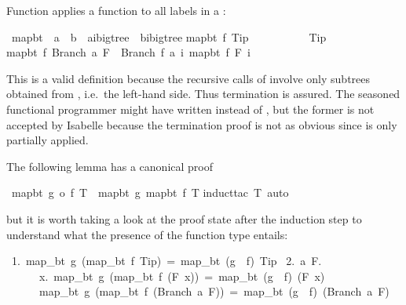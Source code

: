 \begin{isabelle}
\begin{isamarkuptext}
Function  applies a function to all labels in a :%
\end{isamarkuptext}%
\ map{\isacharunderscore}bt\ {\isacharcolon}{\isacharcolon}\ {\isachardoublequote}{\isacharparenleft}{\isacharprime}a\ {\isasymRightarrow}\ {\isacharprime}b{\isacharparenright}\ {\isasymRightarrow}\ {\isacharparenleft}{\isacharprime}a{\isacharcomma}{\isacharprime}i{\isacharparenright}bigtree\ {\isasymRightarrow}\ {\isacharparenleft}{\isacharprime}b{\isacharcomma}{\isacharprime}i{\isacharparenright}bigtree{\isachardoublequote}\isanewline
{}\isanewline
{\isachardoublequote}map{\isacharunderscore}bt\ f\ Tip\ \ \ \ \ \ \ \ \ \ {\isacharequal}\ Tip{\isachardoublequote}\isanewline
{\isachardoublequote}map{\isacharunderscore}bt\ f\ {\isacharparenleft}Branch\ a\ F{\isacharparenright}\ {\isacharequal}\ Branch\ {\isacharparenleft}f\ a{\isacharparenright}\ {\isacharparenleft}{\isasymlambda}i{\isachardot}\ map{\isacharunderscore}bt\ f\ {\isacharparenleft}F\ i{\isacharparenright}{\isacharparenright}{\isachardoublequote}%
\begin{isamarkuptext}%
\noindent This is a valid  definition because the
recursive calls of  involve only subtrees obtained from
, i.e.\ the left-hand side. Thus termination is assured.  The
seasoned functional programmer might have written 
instead of , but the former is not accepted by
Isabelle because the termination proof is not as obvious since
 is only partially applied.

The following lemma has a canonical proof%
\end{isamarkuptext}%
\ {\isachardoublequote}map{\isacharunderscore}bt\ {\isacharparenleft}g\ o\ f{\isacharparenright}\ T\ {\isacharequal}\ map{\isacharunderscore}bt\ g\ {\isacharparenleft}map{\isacharunderscore}bt\ f\ T{\isacharparenright}{\isachardoublequote}\isanewline
{}induct{\isacharunderscore}tac\ {\isachardoublequote}T{\isachardoublequote}{\isacharcomma}\ auto{\isacharparenright}%
\begin{isamarkuptext}%
\noindent
but it is worth taking a look at the proof state after the induction step
to understand what the presence of the function type entails:
\begin{isabellepar}%
~1.~map\_bt~g~(map\_bt~f~Tip)~=~map\_bt~(g~{\isasymcirc}~f)~Tip\isanewline
~2.~{\isasymAnd}a~F.\isanewline
~~~~~~{\isasymforall}x.~map\_bt~g~(map\_bt~f~(F~x))~=~map\_bt~(g~{\isasymcirc}~f)~(F~x)~{\isasymLongrightarrow}\isanewline
~~~~~~map\_bt~g~(map\_bt~f~(Branch~a~F))~=~map\_bt~(g~{\isasymcirc}~f)~(Branch~a~F)%
\end{isabellepar}%
\end{isamarkuptext}%
\end{isabelle}%
